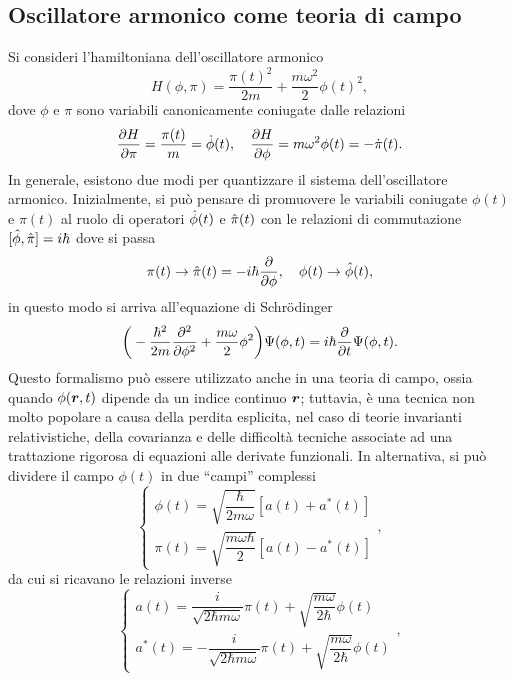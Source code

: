 \subsection{Oscillatore armonico come teoria di campo}
Si consideri l'hamiltoniana dell'oscillatore armonico 
\begin{equation}
\label{eq: hamiltoniana oscillatore armonico}
    H(\phi,\pi) = \frac{\pi(t)^2}{2m} + \frac{m\omega^2}{2}\phi(t)^2,
\end{equation}
dove $\phi$ e $\pi$ sono variabili canonicamente coniugate dalle relazioni
\begin{equation}
    \frac{\partial H}{\partial \pi} = \frac{\pi(t)}{m} = \dot{\phi}(t),\quad \frac{\partial H}{\partial \phi} = m\omega^2\phi(t) = -\dot{\pi}(t).
\end{equation}
In generale, esistono due modi per quantizzare il sistema dell'oscillatore armonico. Inizialmente, si può pensare di promuovere le variabili coniugate $\phi(t)$ e $\pi(t)$ al ruolo di operatori $\hat{\phi}(t)$ e $\hat{\pi}(t)$ con le relazioni di commutazione $[\hat{\phi},\hat{\pi}] = i\hbar$ dove si passa
\begin{equation}
    \pi(t) \to \hat{\pi}(t) = -i\hbar\frac{\partial}{\partial \phi},\quad \phi(t) \to \hat{\phi}(t),
\end{equation}
in questo modo si arriva all'equazione di Schr\"odinger 
\begin{equation}
    \bigg(-\frac{\hbar^2}{2m}\frac{\partial^2}{\partial \phi^2} + \frac{m\omega}{2}\phi^2\bigg)\Psi(\phi,t) = i\hbar\frac{\partial}{\partial t}\Psi(\phi,t).
\end{equation}
Questo formalismo può essere utilizzato anche in una teoria di campo, ossia quando $\phi(\bm{r},t)$ dipende da un indice continuo $\bm{r}$; tuttavia, è una tecnica non molto popolare a causa della perdita esplicita, nel caso di teorie invarianti relativistiche, della covarianza e delle difficoltà tecniche associate ad una trattazione rigorosa di equazioni alle derivate funzionali. In alternativa, si può dividere il campo $\phi(t)$ in due ``campi'' complessi
\begin{equation}
    \begin{cases}
        \phi(t) = \sqrt{\dfrac{\hbar}{2m\omega}}[a(t) + a^*(t)] \\[2ex]
        \pi(t) = \sqrt{\dfrac{m\omega\hbar}{2}}[a(t) - a^*(t)]
    \end{cases},
\end{equation}
da cui si ricavano le relazioni inverse
\begin{equation}
    \begin{cases}
        a(t) = \dfrac{i}{\sqrt{2\hbar m\omega}}\pi(t) + \sqrt{\dfrac{m\omega}{2\hbar}}\phi(t) \\
        a^*(t) = -\dfrac{i}{\sqrt{2\hbar m\omega}}\pi(t) + \sqrt{\dfrac{m\omega}{2\hbar}}\phi(t)
    \end{cases},
\end{equation}
